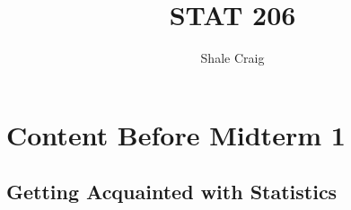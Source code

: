 \ifdefined\isphone
  
\else
  
\fi

\usepackage{listings}
\usepackage{imakeidx}

\makeindex

\title{STAT 206}

\author{Shale Craig}

\lstset{language=Python}

\newcommand{\ex}{\textbf{Example:} }


    \maketitle

    \tableofcontents

    \mainmatter

    \part{Content Before Midterm 1} %
    \label{prt:content_ _before_ _midterm_ _1_}
        \chapter{Getting Acquainted with Statistics} %
        \label{cha:getting_acquainted_with_statistics}

